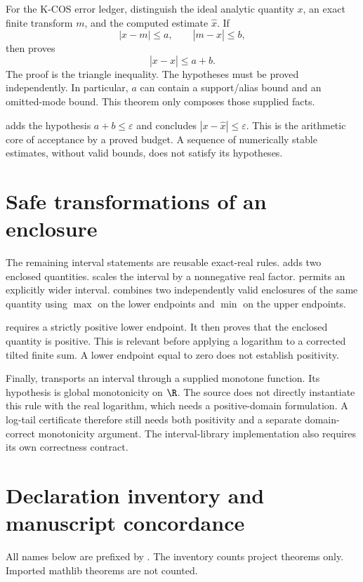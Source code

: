For the K-COS error ledger, distinguish the ideal analytic quantity $x$, an
exact finite transform $m$, and the computed estimate $\widehat x$. If
\[
 |x-m|\le a,\qquad |m-\widehat x|\le b,
\]
then  proves
\[
 |x-\widehat x|\le a+b.
\]
The proof is the triangle inequality. The hypotheses must be proved
independently. In particular, $a$ can contain a support/alias bound and an
omitted-mode bound. This theorem only composes those supplied facts.

 adds the hypothesis $a+b\le\varepsilon$ and concludes
$|x-\widehat x|\le\varepsilon$. This is the arithmetic core of acceptance by a
proved budget. A sequence of numerically stable estimates, without valid
bounds, does not satisfy its hypotheses.

\section{Safe transformations of an enclosure}

The remaining interval statements are reusable exact-real rules.
 adds two enclosed quantities.
 scales the interval by a nonnegative real factor.
 permits an explicitly wider interval.
 combines two independently valid enclosures of the
same quantity using $\max$ on the lower endpoints and $\min$ on the upper
endpoints.

 requires a strictly positive lower endpoint. It then
proves that the enclosed quantity is positive. This is relevant before
applying a logarithm to a corrected tilted finite sum. A lower endpoint equal
to zero does not establish positivity.

Finally,  transports an interval through a supplied
monotone function. Its hypothesis is global monotonicity on $\R$. The source
does not directly instantiate this rule with the real logarithm, which needs
a positive-domain formulation. A log-tail certificate therefore still needs
both positivity and a separate domain-correct monotonicity argument. The
interval-library implementation also requires its own correctness contract.

\section{Declaration inventory and manuscript concordance}

All names below are prefixed by . The inventory counts
project theorems only. Imported mathlib theorems are not counted.

